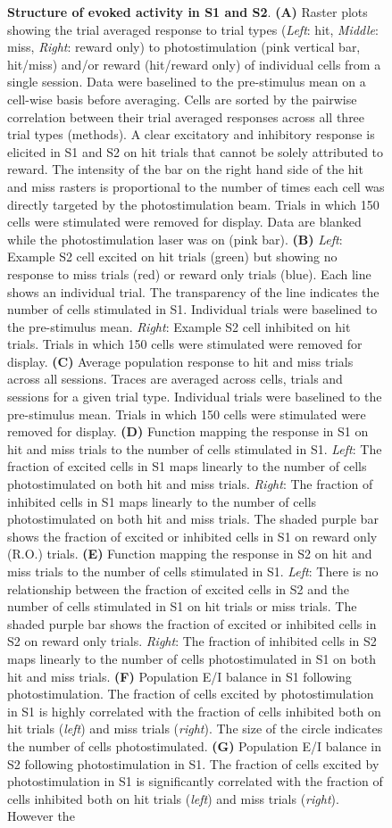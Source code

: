\begin{figure}[htbp]
{\textbf{Structure of evoked activity in S1 and S2}. \textbf{(A)} Raster plots showing the trial averaged response to trial types (\textit{Left}: hit, \textit{Middle}: miss, \textit{Right}: reward only) to photostimulation (pink vertical bar, hit/miss)  and/or reward (hit/reward only) of individual cells from a single session. Data were baselined to the pre-stimulus mean on a cell-wise basis before averaging. Cells are sorted by the pairwise correlation between their trial averaged responses across all three trial types (methods). A clear excitatory and inhibitory response is elicited in S1 and S2 on hit trials that cannot be solely attributed to reward. The intensity of the bar on the right hand side of the hit and miss rasters is proportional to the number of times each cell was directly targeted by the photostimulation beam. Trials in which 150 cells were stimulated were removed for display. Data are blanked while the photostimulation laser was on (pink bar). \textbf{(B)} \textit{Left}: Example S2 cell excited on hit trials (green) but showing no response to miss trials (red) or reward only trials (blue). Each line shows an individual trial. The transparency of the line indicates the number of cells stimulated in S1. Individual trials were baselined to the pre-stimulus mean. \textit{Right}: Example S2 cell inhibited on hit trials. Trials in which 150 cells were stimulated were removed for display. \textbf{(C)} Average population response to hit and miss trials across all sessions. Traces are averaged across cells, trials and sessions for a given trial type. Individual trials were baselined to the pre-stimulus mean. Trials in which 150 cells were stimulated were removed for display. \textbf{(D)} Function mapping the response in S1 on hit and miss trials to the number of cells stimulated in S1. \textit{Left}: The fraction of excited cells in S1 maps linearly to the number of cells photostimulated on both hit and miss trials. \textit{Right}: The fraction of inhibited cells in S1 maps linearly to the number of cells photostimulated on both hit and miss trials. The shaded purple bar shows the fraction of excited or inhibited cells in S1 on reward only (R.O.) trials. \textbf{(E)} Function mapping the response in S2 on hit and miss trials to the number of cells stimulated in S1. \textit{Left}: There is no relationship between the fraction of excited cells in S2 and the number of cells stimulated in S1 on hit trials or miss trials. The shaded purple bar shows the fraction of excited or inhibited cells in S2 on reward only trials. \textit{Right}: The fraction of inhibited cells in S2 maps linearly to the number of cells photostimulated in S1 on both hit and miss trials. \textbf{(F)} Population E/I balance in S1 following photostimulation. The fraction of cells excited by photostimulation in S1 is highly correlated with the fraction of cells inhibited both on hit trials (\textit{left}) and miss trials (\textit{right}). The size of the circle indicates the number of cells photostimulated. \textbf{(G)} Population E/I balance in S2 following photostimulation in S1. The fraction of cells excited by photostimulation in S1 is significantly correlated with the fraction of cells inhibited both on hit trials (\textit{left}) and miss trials (\textit{right}). However the }
\end{figure}

